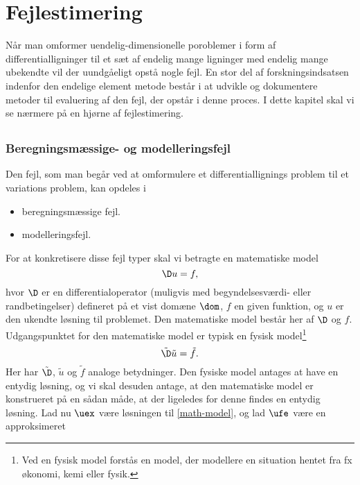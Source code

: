\chapter{Fejlestimering} 
Når man omformer uendelig-dimensionelle poroblemer i form af
differentialligninger til et sæt af endelig mange ligninger med
endelig mange ubekendte vil der uundgåeligt opstå nogle fejl. En stor
del af forskningsindsatsen indenfor den endelige element metode består
i at udvikle og dokumentere metoder til evaluering af den fejl, der
opstår i denne proces. I dette kapitel skal vi se nærmere på en hjørne
af fejlestimering.

\section{}

\subsection{Beregningsmæssige- og modelleringsfejl}
Den fejl, som man begår ved at omformulere et differentiallignings
problem til et variations problem, kan opdeles i 
\begin{itemize}
  \item beregningsmæssige fejl.
  \item modelleringsfejl.
\end{itemize}
For at konkretisere disse fejl typer skal vi betragte en matematiske model
\begin{equation} \label{math-model}
  \D u=f,
\end{equation}
hvor $\D$ er en differentialoperator (muligvis med begyndelsesværdi-
eller rand\-be\-tin\-gel\-ser) defineret på et vist domæne $\dom$, $f$ en 
given funktion, og $u$ er den ukendte løsning til problemet. Den 
matematiske model består her af $\D$ og $f$. Udgangspunktet for den
matematiske model er typisk en fysisk model\footnote{Ved en fysisk
model forstås en model, der modellere en situation hentet fra fx
økonomi, kemi eller fysik.}
\begin{equation} \label{phys-model}
  \tilde{\D} \tilde{u} = \tilde{f}.
\end{equation}
Her har $\tilde{\D}$, $\tilde{u}$ og $\tilde{f}$ analoge betydninger.
Den fysiske model antages at have en entydig løsning, og vi skal
desuden antage, at den matematiske model er konstrueret på en sådan
måde, at der ligeledes for denne findes en entydig løsning. Lad nu
$\uex$ være løsningen til \eqref{math-model}, og lad $\ufe$ være en approksimeret 
